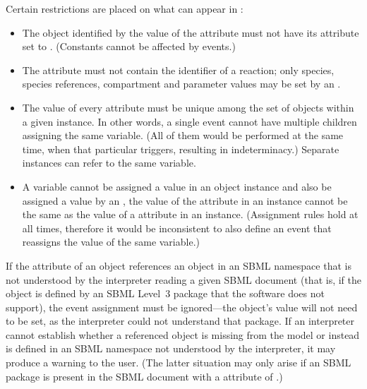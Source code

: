 Certain restrictions are placed on what can appear in
:
\begin{itemize}
  
\item The object identified by the value of the 
  attribute must not have its  attribute set 
  to .  (Constants cannot be affected by events.)
  
\item The  attribute must not contain the
  identifier of a reaction;  only species, species references,
  compartment and parameter values may be set by an \Event.
  
\item The value of every  attribute must be unique
  among the set of \EventAssignment objects within a given
  \Event instance.  In other words, a single event cannot have
  multiple \EventAssignment children assigning the same variable.  (All
  of them would be performed at the same time, when that
  particular \Event triggers, resulting in indeterminacy.)
  Separate \Event instances can refer to the same variable.
  
\item A variable cannot be assigned a value in an \EventAssignment
  object instance and also be assigned a value by an
  \AssignmentRule, \ie the value of the  attribute
  in an \EventAssignment instance cannot be the same as the value
  of a  attribute in an \AssignmentRule instance.
  (Assignment rules hold at all times, therefore it would be
  inconsistent to also define an event that reassigns the value of
  the same variable.)

\end{itemize}

\begin{blockChanged}

If the  attribute of an \EventAssignment object references an object in an SBML namespace that is not understood by the interpreter reading a given SBML document (that is, if the object is defined by an SBML Level~3 package that the software does not support), the event assignment must be ignored---the object's value will not need to be set, as the interpreter could not understand that package.  If an interpreter cannot establish whether a referenced object is missing from the model or instead is defined in an SBML namespace not understood by the interpreter, it may produce a warning to the user.  (The latter situation may only arise if an SBML package is present in the SBML document with a  attribute of .)

\end{blockChanged}

